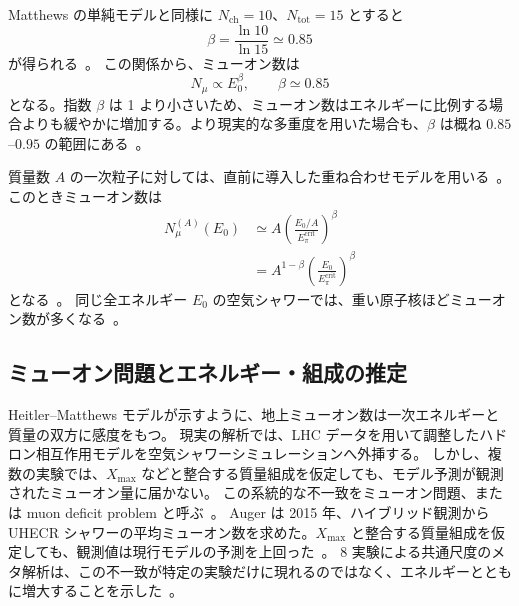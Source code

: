 \documentclass[book,paper=a4,fontsize=11pt]{jlreq}
\begin{document}
Matthews の単純モデルと同様に \(N_{\mathrm{ch}}=10\)、\(N_{\mathrm{tot}}=15\) とすると
\[
  \beta = \frac{\ln 10}{\ln 15}\simeq 0.85
\]
が得られる~\cite{Matthews2005}。
この関係から、ミューオン数は
\begin{equation}
  N_\mu \propto E_0^{\beta},
  \qquad
  \beta\simeq 0.85
\end{equation}
となる。指数 \(\beta\) は 1 より小さいため、ミューオン数はエネルギーに比例する場合よりも緩やかに増加する。より現実的な多重度を用いた場合も、\(\beta\) は概ね \(0.85\)--\(0.95\) の範囲にある~\cite{PDGCosmicRays}。

質量数 \(A\) の一次粒子に対しては、直前に導入した重ね合わせモデルを用いる~\cite{Matthews2005,Montanus2013,Stanev2004}。
このときミューオン数は
\begin{align}
  N_\mu^{(A)}(E_0)
  &\simeq A\left(\frac{E_0/A}{E_\pi^{\mathrm{crit}}}\right)^{\beta} \\
  &= A^{1-\beta}\left(\frac{E_0}{E_\pi^{\mathrm{crit}}}\right)^{\beta}
\end{align}
となる~\cite{Matthews2005,Montanus2013}。
同じ全エネルギー \(E_0\) の空気シャワーでは、重い原子核ほどミューオン数が多くなる~\cite{Matthews2005,Montanus2013}。

\subsection{ミューオン問題とエネルギー・組成の推定}\label{subsec:muon_puzzle}
Heitler--Matthews モデルが示すように、地上ミューオン数は一次エネルギーと質量の双方に感度をもつ。
現実の解析では、LHC データを用いて調整したハドロン相互作用モデルを空気シャワーシミュレーションへ外挿する。
しかし、複数の実験では、\(X_{\max}\) などと整合する質量組成を仮定しても、モデル予測が観測されたミューオン量に届かない。
この系統的な不一致をミューオン問題、または muon deficit problem と呼ぶ~\cite{DembinskiMuon2019,AlbrechtMuonPuzzle2022}。
Auger は 2015 年、ハイブリッド観測から UHECR シャワーの平均ミューオン数を求めた。\(X_{\max}\) と整合する質量組成を仮定しても、観測値は現行モデルの予測を上回った~\cite{AugerMuon2015}。
8 実験による共通尺度のメタ解析は、この不一致が特定の実験だけに現れるのではなく、エネルギーとともに増大することを示した~\cite{DembinskiMuon2019}。
\end{document}
